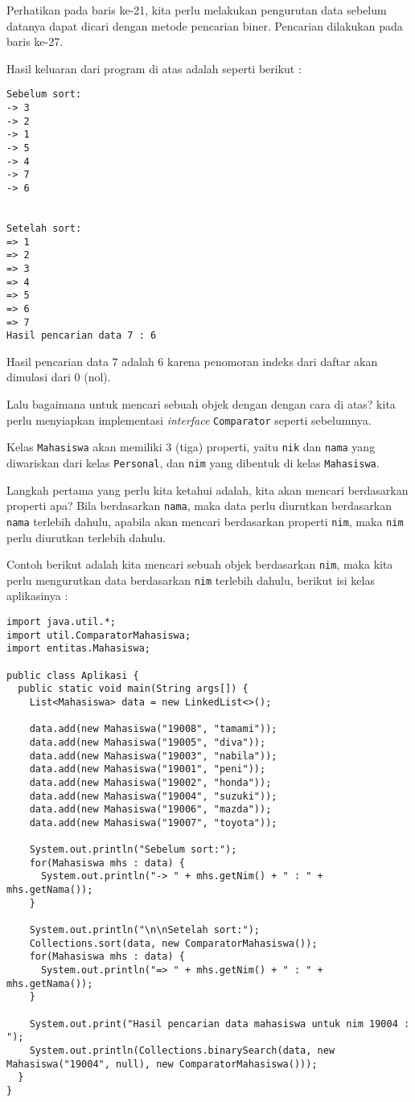 Perhatikan pada baris ke-21, kita perlu melakukan pengurutan data sebelum datanya dapat dicari dengan metode pencarian biner. Pencarian dilakukan pada baris ke-27.

Hasil keluaran dari program di atas adalah seperti berikut :

\begin{lstlisting}
Sebelum sort:
-> 3
-> 2
-> 1
-> 5
-> 4
-> 7
-> 6


Setelah sort:
=> 1
=> 2
=> 3
=> 4
=> 5
=> 6
=> 7
Hasil pencarian data 7 : 6
\end{lstlisting}

Hasil pencarian data 7 adalah 6 karena penomoran indeks dari daftar akan dimulasi dari 0 (nol).

Lalu bagaimana untuk mencari sebuah objek dengan dengan cara di atas? kita perlu menyiapkan implementasi \textit{interface} \texttt{Comparator} seperti sebelumnya.

Kelas \texttt{Mahasiswa} akan memiliki 3 (tiga) properti, yaitu \texttt{nik} dan \texttt{nama} yang diwariskan dari kelas \texttt{Personal}, dan \texttt{nim} yang dibentuk di kelas \texttt{Mahasiswa}.

Langkah pertama yang perlu kita ketahui adalah, kita akan mencari berdasarkan properti apa? Bila berdasarkan \texttt{nama}, maka data perlu diurutkan berdasarkan \texttt{nama} terlebih dahulu, apabila akan mencari berdasarkan properti \texttt{nim}, maka \texttt{nim} perlu diurutkan terlebih dahulu.

Contoh berikut adalah kita mencari sebuah objek berdasarkan \texttt{nim}, maka kita perlu mengurutkan data berdasarkan \texttt{nim} terlebih dahulu, berikut isi kelas aplikasinya :

\begin{lstlisting}
import java.util.*;
import util.ComparatorMahasiswa;
import entitas.Mahasiswa;

public class Aplikasi {
  public static void main(String args[]) {
    List<Mahasiswa> data = new LinkedList<>();

    data.add(new Mahasiswa("19008", "tamami"));
    data.add(new Mahasiswa("19005", "diva"));
    data.add(new Mahasiswa("19003", "nabila"));
    data.add(new Mahasiswa("19001", "peni"));
    data.add(new Mahasiswa("19002", "honda"));
    data.add(new Mahasiswa("19004", "suzuki"));
    data.add(new Mahasiswa("19006", "mazda"));
    data.add(new Mahasiswa("19007", "toyota"));

    System.out.println("Sebelum sort:");
    for(Mahasiswa mhs : data) {
      System.out.println("-> " + mhs.getNim() + " : " + mhs.getNama());
    }

    System.out.println("\n\nSetelah sort:");
    Collections.sort(data, new ComparatorMahasiswa());
    for(Mahasiswa mhs : data) {
      System.out.println("=> " + mhs.getNim() + " : " + mhs.getNama());
    }

    System.out.print("Hasil pencarian data mahasiswa untuk nim 19004 : ");
    System.out.println(Collections.binarySearch(data, new Mahasiswa("19004", null), new ComparatorMahasiswa()));
  }
}
\end{lstlisting}

